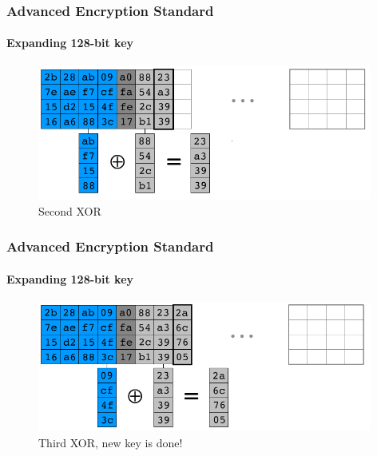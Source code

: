 \begin{frame}
	\frametitle{Advanced Encryption Standard}
	\framesubtitle{Expanding 128-bit key}
	\begin{figure}
		\vfill
		\centering
		\includegraphics[width=11cm]{keysch8}
		\caption{Second XOR }
		\label{fig:obrazek keysch8}
	\end{figure}
\end{frame}

\begin{frame}
	\frametitle{Advanced Encryption Standard}
	\framesubtitle{Expanding 128-bit key}
	\begin{figure}
		\vfill
		\centering
		\includegraphics[width=11cm]{keysch9}
		\caption{Third XOR, new key is done! }
		\label{fig:obrazek keysch9}
	\end{figure}
\end{frame}

